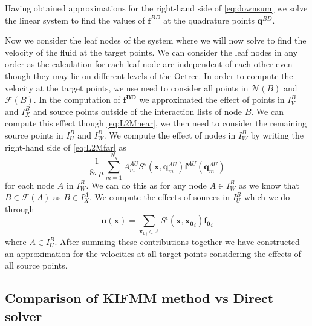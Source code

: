 Having obtained approximations for the right-hand side of \cref{eq:downsum} we solve the linear system to find the values of $\mathbf{f}^{BD}$ at the quadrature points $\mathbf{q}^{BD}$. 

Now we consider the leaf nodes of the system where we will now solve to find the velocity of the fluid at the target points. We can consider the leaf nodes in any order as the calculation for each leaf node are independent of each other even though they may lie on different levels of the Octree. In order to compute the velocity at the target points, we use need to consider all points in $\mathcal{N}(B)$ and $\mathcal{F}(B)$. In the computation of  $\mathbf{f^{BD}}$ we approximated the effect of points in $I_V^B$ and $I_X^B$ and source points outside of the interaction lists of node $B$. We can compute this effect though \cref{eq:L2Mnear}, we then need to consider the remaining source points in $I_U^B$ and $I_W^B$. We compute the effect of nodes in $I_W^B$ by writing the right-hand side of \cref{eq:L2Mfar} as 
\begin{equation*}
    \frac{1}{8 \pi \mu} \sum_{m=1}^{N_{q}} A_{m}^{AU} S^\epsilon\left(\mathbf{x}, \mathbf{q}_{m}^{A U}\right) \mathbf{f}^{A U}\left(\mathbf{q}_{m}^{A U}\right)
\end{equation*}
for each node $A$ in $I_W^B$. We can do this as for any node $A \in I_W^B$ as we know that $B\in\mathcal{F}(A)$ as $B\in I_X^A$. We compute the effects of sources in $I_U^B$ which we do through 
\begin{equation*}
    \mathbf{u}(\mathbf{x}) = \sum_{\mathbf{x_0}_i\in A} S^\epsilon(\mathbf{x},\mathbf{x_{0}}_i)\mathbf{f_{0}}_i
\end{equation*}
where $A \in I_U^B$. After summing these contributions together we have constructed an approximation for the velocities at all target points considering the effects of all source points.

\subsection{Comparison of KIFMM method vs Direct solver}